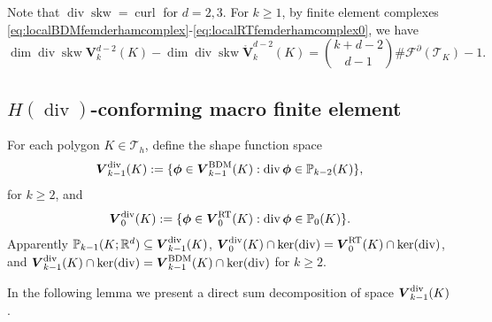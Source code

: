 \documentclass[10pt]{amsart}
\newcommand{\curl}{\operatorname{curl}}
\renewcommand{\div}{\operatorname{div}}
\newcommand{\skw}{\operatorname{skw}}
\numberwithin{equation}{section}
\begin{document}
Note that $\div\skw=\curl$ for $d=2,3$.
For $k\geq1$, by finite element complexes \eqref{eq:localBDMfemderhamcomplex}-\eqref{eq:localRTfemderhamcomplex0}, we have
\begin{equation}\label{eq:20220324-4}
\dim\div\skw\boldsymbol{V}_{k}^{d-2}(K)-\dim\div\skw\mathring{\boldsymbol{V}}_{k}^{d-2}(K)={k+d-2\choose d-1}\#\mathcal F^{\partial}(\mathcal T_K)-1.
\end{equation}

\subsection{$H(\div)$-conforming macro finite element}
For each polygon $K\in \mathcal T_h$, 
define the shape function space
\[
\boldsymbol{V}_{k-1}^{\rm div}(K):=\{\boldsymbol{\phi}\in\boldsymbol{V}_{k-1}^{\mathrm{BDM}}(K): \div\boldsymbol{\phi}\in\mathbb P_{k-2}(K)\},
\]
for $k\geq 2$, and 
\[
\boldsymbol{V}_{0}^{\rm div}(K):=\{\boldsymbol{\phi}\in\boldsymbol{V}_{0}^{\mathrm{RT}}(K): \div\boldsymbol{\phi}\in\mathbb P_{0}(K)\}.
\]
Apparently $\mathbb P_{k-1}(K;\mathbb R^d)\subseteq\boldsymbol{V}_{k-1}^{\rm div}(K)$, $\boldsymbol{V}_{0}^{\rm div}(K)\cap\ker(\div)=\boldsymbol{V}_0^{\mathrm{RT}}(K)\cap\ker(\div)$, and $\boldsymbol{V}_{k-1}^{\rm div}(K)\cap\ker(\div)=\boldsymbol{V}_{k-1}^{\mathrm{BDM}}(K)\cap\ker(\div)$ for $k\geq2$.


In the following lemma we present a direct sum decomposition of space $\boldsymbol{V}_{k-1}^{\rm div}(K)$.
\end{document}

